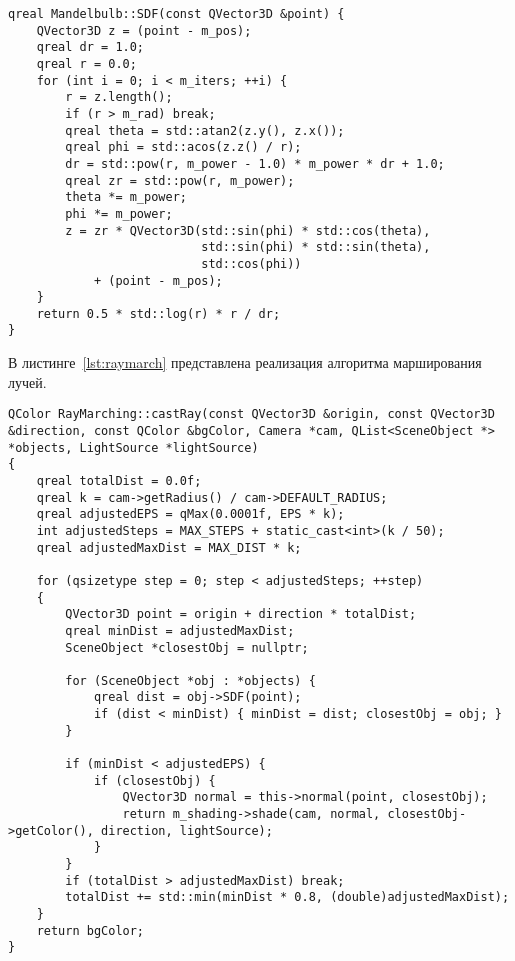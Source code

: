\begin{lstlisting}[label=lst:mandelbulb_sdf,caption=Функция SDF для оболочки Мандельброта]
qreal Mandelbulb::SDF(const QVector3D &point) {
    QVector3D z = (point - m_pos);
    qreal dr = 1.0;
    qreal r = 0.0;
    for (int i = 0; i < m_iters; ++i) {
        r = z.length();
        if (r > m_rad) break;
        qreal theta = std::atan2(z.y(), z.x());
        qreal phi = std::acos(z.z() / r);
        dr = std::pow(r, m_power - 1.0) * m_power * dr + 1.0;
        qreal zr = std::pow(r, m_power);
        theta *= m_power;
        phi *= m_power;
        z = zr * QVector3D(std::sin(phi) * std::cos(theta),
                           std::sin(phi) * std::sin(theta),
                           std::cos(phi))
            + (point - m_pos);
    }
    return 0.5 * std::log(r) * r / dr;
}
\end{lstlisting}

\clearpage

В листинге~\ref{lst:raymarch} представлена реализация алгоритма марширования лучей.

\begin{lstlisting}[label=lst:raymarch,caption=Алгоритм марширования лучей]
QColor RayMarching::castRay(const QVector3D &origin, const QVector3D &direction, const QColor &bgColor, Camera *cam, QList<SceneObject *> *objects, LightSource *lightSource)
{
    qreal totalDist = 0.0f;
    qreal k = cam->getRadius() / cam->DEFAULT_RADIUS;
    qreal adjustedEPS = qMax(0.0001f, EPS * k);
    int adjustedSteps = MAX_STEPS + static_cast<int>(k / 50);
    qreal adjustedMaxDist = MAX_DIST * k;

    for (qsizetype step = 0; step < adjustedSteps; ++step)
    {
        QVector3D point = origin + direction * totalDist;
        qreal minDist = adjustedMaxDist;
        SceneObject *closestObj = nullptr;

        for (SceneObject *obj : *objects) {
            qreal dist = obj->SDF(point);
            if (dist < minDist) { minDist = dist; closestObj = obj; }
        }

        if (minDist < adjustedEPS) {
            if (closestObj) {
                QVector3D normal = this->normal(point, closestObj);
                return m_shading->shade(cam, normal, closestObj->getColor(), direction, lightSource);
            }
        }
        if (totalDist > adjustedMaxDist) break;
        totalDist += std::min(minDist * 0.8, (double)adjustedMaxDist);
    }
    return bgColor;
}
\end{lstlisting}

